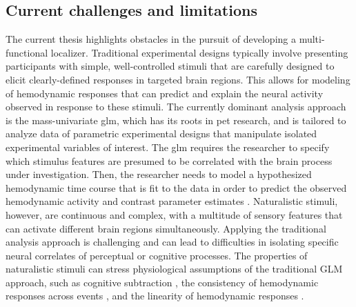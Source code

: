 \subsection{Current challenges and limitations}

%
The current thesis highlights obstacles in the pursuit of developing a
multi-functional localizer.
%
Traditional experimental designs typically involve presenting participants with
simple, well-controlled stimuli that are carefully designed to elicit
clearly-defined responses in targeted brain regions.
%
This allows for modeling of hemodynamic responses that can predict and explain
the neural activity observed in response to these stimuli.
%
The currently dominant analysis approach is the mass-univariate \ac{glm}, which
has its roots in \ac{pet} research, and is tailored to analyze data of
parametric experimental designs that manipulate isolated experimental variables
of interest.
%
The \ac{glm} requires the researcher to specify which stimulus features are
presumed to be correlated with the brain process under investigation.
%
Then, the researcher needs to model a hypothesized hemodynamic time course that
is fit to the data in order to predict the observed hemodynamic activity and
contrast parameter estimates \citep{friston1998event}.
%
Naturalistic stimuli, however, are continuous and complex, with a multitude of
sensory features that can activate different brain regions simultaneously.
%
Applying the traditional analysis approach is challenging and can lead to
difficulties in isolating specific neural correlates of perceptual or cognitive
processes.
%
The properties of naturalistic stimuli can stress physiological assumptions of
the traditional GLM approach, such as cognitive subtraction
\citep{friston1996trouble}, the consistency of hemodynamic responses across
events \citep[the rationale behind \textit{trial-averaging};
cf.][]{dale1997selective}, and the linearity of hemodynamic responses
\citep{cohen1997parametric, boynton1996linear, dale1999optimal}.  

